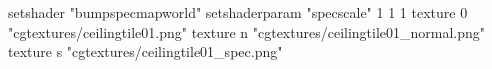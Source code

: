 setshader "bumpspecmapworld"
setshaderparam "specscale" 1 1 1
    texture 0 "cgtextures/ceilingtile01.png"
    texture n "cgtextures/ceilingtile01_normal.png"
    texture s "cgtextures/ceilingtile01_spec.png"